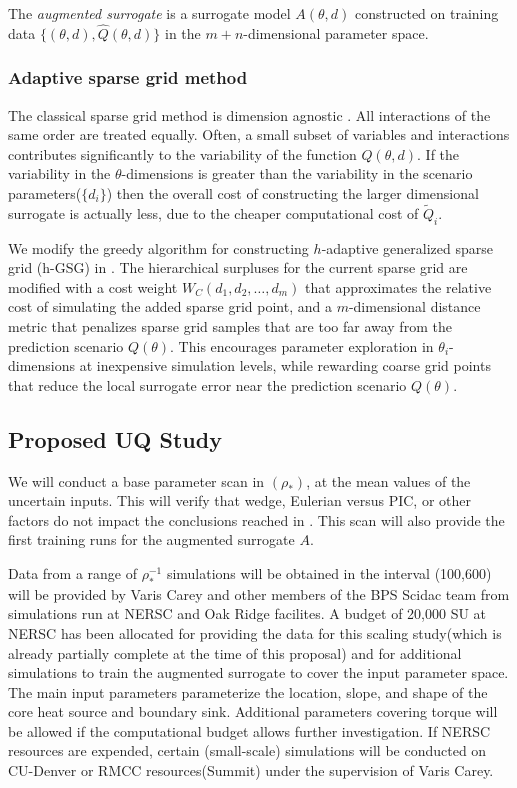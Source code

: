 \documentclass{article}
\begin{document}
The {\em augmented surrogate} is a surrogate model $A(\theta,d)$ constructed on training data $\{(\theta,d),\hat{Q}(\theta,d)\}$ in the $m+n$-dimensional
parameter space.   %

\subsubsection*{Adaptive sparse grid method}  
The classical sparse grid method is dimension agnostic \cite{Bungartz}. All interactions
of the same order are treated equally. Often, a small subset of variables
and interactions contributes significantly to the variability of the function $Q(\theta,d)$.  If the variability in the $\theta$-dimensions is
greater than the variability in the scenario parameters($\{d_i\}$) then the overall cost of constructing the 
larger dimensional surrogate is actually less, due to the cheaper computational cost of $\tilde{Q}_i$.

We modify the 
greedy algorithm for constructing $h$-adaptive generalized sparse grid (h-GSG) in \cite{Jakeman2011LocalAD}.
The hierarchical surpluses for the current sparse grid are modified with a cost weight $W_C(d_1,d_2,\ldots,d_m)$ that approximates the relative
cost of simulating the added sparse grid point, and a $m$-dimensional distance metric that penalizes sparse grid
samples that are too far away from the prediction scenario $Q(\theta)$.  This encourages parameter exploration in $\theta_i$-dimensions at
inexpensive simulation levels, while rewarding coarse grid points that reduce the local surrogate error near the prediction scenario $Q(\theta)$.  

\subsection{Proposed UQ Study}
We will conduct a base parameter scan in $(\rho_*)$, at the mean values of the uncertain inputs.  This will verify that wedge, Eulerian versus PIC, or other factors do not impact the conclusions reached in \cite{Yas_Ido}.  This scan will also provide the first training runs for
the augmented surrogate $A$.  

Data from a range of $\rho^{-1}_*$ simulations will be obtained in the interval (100,600) will be provided by Varis Carey and other members
of the BPS Scidac team  from simulations run at NERSC and Oak Ridge facilites.  A budget of 20,000 SU at NERSC has been allocated for providing the data for this scaling study(which is already partially complete at the time of this proposal)
 and for additional simulations to train the augmented surrogate to cover the input parameter space.
The main input parameters parameterize the location, slope, and shape of the core heat source and boundary sink.  Additional parameters covering
torque will be allowed if the computational budget allows further investigation.  If NERSC resources are expended, certain (small-scale)
simulations will be conducted on CU-Denver or RMCC resources(Summit) under the supervision of Varis Carey.
\end{document}
